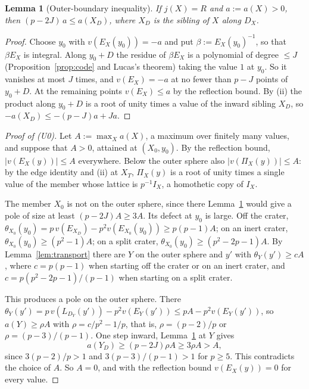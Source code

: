\documentclass[11pt]{amsart}
\numberwithin{equation}{section}
\theoremstyle{plain}
\newtheorem{lemma}[theorem]{Lemma}
\theoremstyle{definition}
\theoremstyle{remark}
\begin{document}
\begin{lemma}[Outer-boundary inequality]\label{lem:outer}
If \(j(X)=R\) and \(a:=a(X)>0\), then \((p-2J)\,a\le a(X_D)\), where \(X_D\) is the sibling of \(X\) along \(D_X\).
\end{lemma}

\begin{proof}
Choose \(y_0\) with \(v(E_X(y_0))=-a\) and put \(\beta:=E_X(y_0)^{-1}\), so that \(\beta E_X\) is integral. Along \(y_0+D\) the residue of \(\beta E_X\) is a polynomial of degree \(\le J\) (Proposition~\ref{prop:code} and Lucas's theorem) taking the value \(1\) at \(y_0\). So it vanishes at most \(J\) times, and \(v(E_X)=-a\) at no fewer than \(p-J\) points of \(y_0+D\). At the remaining points \(v(E_X)\le a\) by the reflection bound. By (ii) the product along \(y_0+D\) is a root of unity times a value of the inward sibling \(X_D\), so \(-a(X_D)\le-(p-J)a+Ja\).
\end{proof}

\begin{proof}[Proof of \textup{(U0)}]
Let \(A:=\max_Xa(X)\), a maximum over finitely many values, and suppose that \(A>0\), attained at \((X_0,y_0)\). By the reflection bound, \(|v(E_X(y))|\le A\) everywhere. Below the outer sphere also \(|v(\Pi_X(y))|\le A\): by the edge identity and (ii) at \(X_T\), \(\Pi_X(y)\) is a root of unity times a single value of the member whose lattice is \(p^{-1}I_X\), a homothetic copy of \(I_X\).

The member \(X_0\) is not on the outer sphere, since there Lemma~\ref{lem:outer} would give a pole of size at least \((p-2J)A\ge3A\). Its defect at \(y_0\) is large. Off the crater, \(\theta_{X_0}(y_0)=p\,v(E_{X_D})-p^2v(E_{X_0}(y_0))\ge p(p-1)A\); on an inert crater, \(\theta_{X_0}(y_0)\ge(p^2-1)A\); on a split crater, \(\theta_{X_0}(y_0)\ge(p^2-2p-1)A\). By Lemma~\ref{lem:transport} there are \(Y\) on the outer sphere and \(y'\) with \(\theta_Y(y')\ge cA\), where \(c=p(p-1)\) when starting off the crater or on an inert crater, and \(c=p(p^2-2p-1)/(p-1)\) when starting on a split crater.

This produces a pole on the outer sphere. There \(\theta_Y(y')=p\,v(L_{D_Y}(y'))-p^2v(E_Y(y'))\le pA-p^2v(E_Y(y'))\), so \(a(Y)\ge\rho A\) with \(\rho=c/p^2-1/p\), that is, \(\rho=(p-2)/p\) or \(\rho=(p-3)/(p-1)\). One step inward, Lemma~\ref{lem:outer} at \(Y\) gives
\[a(Y_D)\ge(p-2J)\rho A\ge3\rho A>A,\]
since \(3(p-2)/p>1\) and \(3(p-3)/(p-1)>1\) for \(p\ge5\). This contradicts the choice of \(A\). So \(A=0\), and with the reflection bound \(v(E_X(y))=0\) for every value.
\end{proof}
\end{document}
